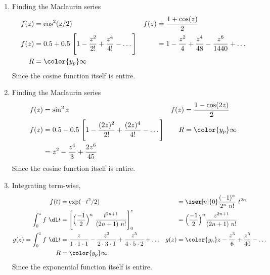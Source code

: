 \begin{enumerate}
    \item Finding the Maclaurin series
          \begin{align}
              f(z)   & = \cos^2(z/2)                                           &
              f(z)   & = \frac{1 + \cos(z)}{2}                                   \\
              f(z)   & = 0.5 + 0.5\ \Bigg[ 1 - \frac{z^2}{2!}
                  + \frac{z^4}{4!} - \dots
              \Bigg] &
                     & = 1 - \frac{z^2}{4} + \frac{z^4}{48} - \frac{z^6}{1440}
              + \dots                                                            \\
              R      & = \color{y_p} \infty
          \end{align}
          Since the cosine function itself is entire.

    \item Finding the Maclaurin series
          \begin{align}
              f(z)   & = \sin^2 z                                &
              f(z)   & = \frac{1 - \cos(2z)}{2}                    \\
              f(z)   & = 0.5 - 0.5\ \Bigg[ 1 - \frac{(2z)^2}{2!}
                  + \frac{(2z)^4}{4!} - \dots
              \Bigg] &
              R      & = \color{y_p} \infty                        \\
                     & = z^2 - \frac{z^4}{3} + \frac{2z^6}{45}
          \end{align}
          Since the cosine function itself is entire.

    \item Integrating term-wise,
          \begin{align}
              f(t)                     & = \exp(-t^2/2)                       &
                                       & = \iser[n]{0} \frac{(-1)^n}{2^n\ n!}
              \ t^{2n}                                                          \\
              \int_0^z f\ \dl t        & = \Bigg[ \Big( \frac{-1}{2} \Big)^n
                  \ \frac{t^{2n+1}}{(2n+1)\ n!}
              \Bigg]_0^z               &
                                       & = \Big( \frac{-1}{2} \Big)^n
              \frac{z^{2n+1}}{(2n+1)\ n!}                                       \\
              g(z) = \int_0^z f\ \dl t & = \frac{z}{1 \cdot 1 \cdot 1}
              - \frac{z^3}{2 \cdot 3 \cdot 1} + \frac{z^5}{4 \cdot 5 \cdot 2}
              + \dots                  &
              g(z)                     & = \color{y_h} z - \frac{z^3}{6}
              + \frac{z^5}{40} - \dots                                          \\
              R                        & = \color{y_p} \infty
          \end{align}
          Since the exponential function itself is entire.


\end{enumerate}
